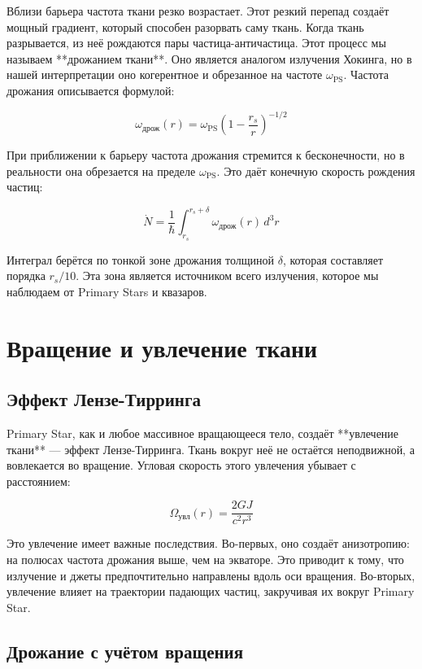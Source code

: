 \documentclass[12pt,a4paper]{article}
\begin{document}
Вблизи барьера частота ткани резко возрастает. Этот резкий перепад создаёт мощный градиент, который способен разорвать саму ткань. Когда ткань разрывается, из неё рождаются пары частица-античастица. Этот процесс мы называем **дрожанием ткани**. Оно является аналогом излучения Хокинга, но в нашей интерпретации оно когерентное и обрезанное на частоте \(\omega_{\text{PS}}\). Частота дрожания описывается формулой:

\[
\omega_{\text{дрож}}(r) = \omega_{\text{PS}} \left(1 - \frac{r_s}{r}\right)^{-1/2}
\]

При приближении к барьеру частота дрожания стремится к бесконечности, но в реальности она обрезается на пределе \(\omega_{\text{PS}}\). Это даёт конечную скорость рождения частиц:

\[
\dot{N} = \frac{1}{\hbar} \int_{r_s}^{r_s+\delta} \omega_{\text{дрож}}(r) \, d^3r
\]

Интеграл берётся по тонкой зоне дрожания толщиной \(\delta\), которая составляет порядка \(r_s/10\). Эта зона является источником всего излучения, которое мы наблюдаем от Primary Stars и квазаров.

\section{Вращение и увлечение ткани}

\subsection{Эффект Лензе-Тирринга}

Primary Star, как и любое массивное вращающееся тело, создаёт **увлечение ткани** — эффект Лензе-Тирринга. Ткань вокруг неё не остаётся неподвижной, а вовлекается во вращение. Угловая скорость этого увлечения убывает с расстоянием:

\[
\Omega_{\text{увл}}(r) = \frac{2GJ}{c^2 r^3}
\]

Это увлечение имеет важные последствия. Во-первых, оно создаёт анизотропию: на полюсах частота дрожания выше, чем на экваторе. Это приводит к тому, что излучение и джеты предпочтительно направлены вдоль оси вращения. Во-вторых, увлечение влияет на траектории падающих частиц, закручивая их вокруг Primary Star.

\subsection{Дрожание с учётом вращения}
\end{document}
